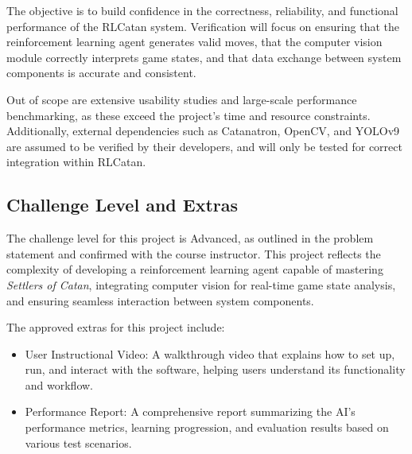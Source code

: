 \documentclass[12pt, titlepage]{article}
\begin{document}
The objective is to build confidence 
in the correctness, reliability, and functional performance of the RLCatan system.
 Verification will focus on ensuring that the reinforcement learning agent generates 
 valid moves, that the computer vision module correctly interprets game states, and 
 that data exchange between system components is accurate and consistent.

\medskip

 Out of scope are extensive usability studies and large-scale performance benchmarking,
 as these exceed the project’s time and resource constraints. Additionally, external
  dependencies such as Catanatron, OpenCV, and YOLOv9 are assumed to be verified by
   their developers, and will only be tested for correct integration within RLCatan.

\subsection{Challenge Level and Extras}



The challenge level for this project is Advanced,
 as outlined in the problem statement and confirmed 
 with the course instructor. This project
  reflects the complexity of developing a 
  reinforcement learning agent capable of
   mastering \textit{Settlers of Catan},
    integrating computer vision for real-time game state 
    analysis, and ensuring seamless interaction between
     system components.

\medskip
The approved extras for this project include:
\begin{itemize}
    \item User Instructional Video: A walkthrough video that explains how to set up, run, and interact with the software, helping users understand its functionality and workflow.
    \item Performance Report: A comprehensive report summarizing the AI's performance metrics, learning progression, and evaluation results based on various test scenarios.
\end{itemize}
\end{document}
